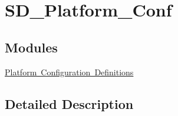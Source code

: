 \hypertarget{group___s_d___platform___conf}{}\section{S\+D\+\_\+\+Platform\+\_\+\+Conf}
\label{group___s_d___platform___conf}
\subsection*{Modules}
\begin{DoxyCompactItemize}
\item 
\mbox{\hyperlink{group___s_d___platform___conf___defines}{Platform Configuration Definitions}}
\end{DoxyCompactItemize}


\subsection{Detailed Description}
